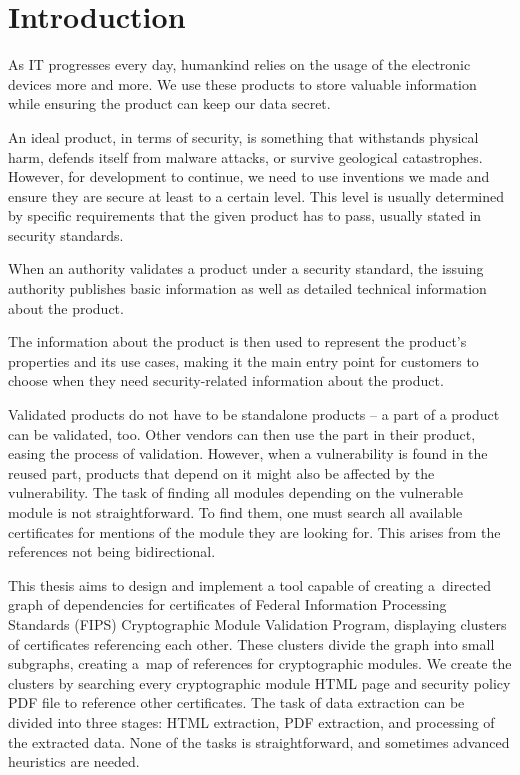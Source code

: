\chapter{Introduction}\label{chap:introduction}

As IT progresses every day, humankind relies on the usage of the electronic devices more and more. We use these products to store valuable information while ensuring the product can keep our data secret.

An ideal product, in terms of security, is something that withstands physical harm, defends itself from malware attacks, or survive geological catastrophes. However, for development to continue, we need to use inventions we made and ensure they are secure at least to a certain level. This level is usually determined by specific requirements that the given product has to pass, usually stated in security standards.


When an authority validates a product under a security standard, the issuing authority publishes basic information as well as detailed technical information about the product.

The information about the product is then used to represent the product's properties and its use cases, making it the main entry point for customers to choose when they need security-related information about the product.

Validated products do not have to be standalone products -- a part of a product can be validated, too. Other vendors can then use the part in their product, easing the process of validation. However, when a vulnerability is found in the reused part, products that depend on it might also be affected by the vulnerability. 
The task of finding all modules depending on the vulnerable module is not straightforward. To find them, one must search all available certificates for mentions of the module they are looking for. This arises from the references not being bidirectional. 

This thesis aims to design and implement a tool capable of creating a~directed graph of dependencies for certificates of Federal Information Processing Standards (FIPS) Cryptographic Module Validation Program, displaying clusters of certificates referencing each other. These clusters divide the graph into small subgraphs, creating a~map of references for cryptographic modules. We create the clusters by searching every cryptographic module HTML page and security policy PDF file to reference other certificates. The task of data extraction can be divided into three stages: HTML extraction, PDF extraction, and processing of the extracted data. None of the tasks is straightforward, and sometimes advanced heuristics are needed.

